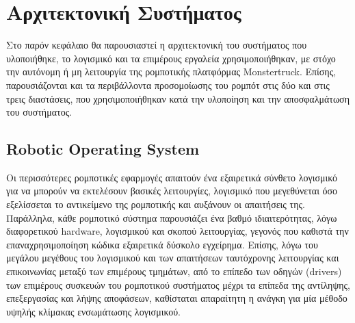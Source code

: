 
\chapter{Αρχιτεκτονική Συστήματος} %

\label{Chapter4}
Στο παρόν κεφάλαιο θα παρουσιαστεί η αρχιτεκτονική του συστήματος που υλοποιήθηκε, το λογισμικό και τα επιμέρους εργαλεία χρησιμοποιήθηκαν, με στόχο την αυτόνομη ή μη λειτουργία της ρομποτικής πλατφόρμας Monstertruck. Επίσης, παρουσιάζονται και τα περιβάλλοντα προσομοίωσης του ρομπότ στις δύο και στις τρεις διαστάσεις, που χρησιμοποιήθηκαν κατά την υλοποίηση και την αποσφαλμάτωση του συστήματος.

\section{Robotic Operating System} \label{sec:ros}
Οι περισσότερες ρομποτικές εφαρμογές απαιτούν ένα εξαιρετικά σύνθετο λογισμικό για να μπορούν να εκτελέσουν βασικές λειτουργίες, λογισμικό που μεγεθύνεται όσο εξελίσσεται το αντικείμενο της ρομποτικής και αυξάνουν οι απαιτήσεις της. Παράλληλα, κάθε ρομποτικό σύστημα παρουσιάζει ένα βαθμό ιδιαιτερότητας, λόγω διαφορετικού hardware, λογισμικού και σκοπού λειτουργίας, γεγονός που καθιστά την επαναχρησιμοποίηση κώδικα εξαιρετικά δύσκολο εγχείρημα. Επίσης, λόγω του μεγάλου μεγέθους του λογισμικού και των απαιτήσεων ταυτόχρονης λειτουργίας και επικοινωνίας μεταξύ των επιμέρους τμημάτων, από το επίπεδο των οδηγών (drivers) των επιμέρους συσκευών του ρομποτικού συστήματος μέχρι τα επίπεδα της αντίληψης, επεξεργασίας και λήψης αποφάσεων, καθίσταται απαραίτητη η ανάγκη για μία μέθοδο υψηλής κλίμακας ενσωμάτωσης λογισμικού.

